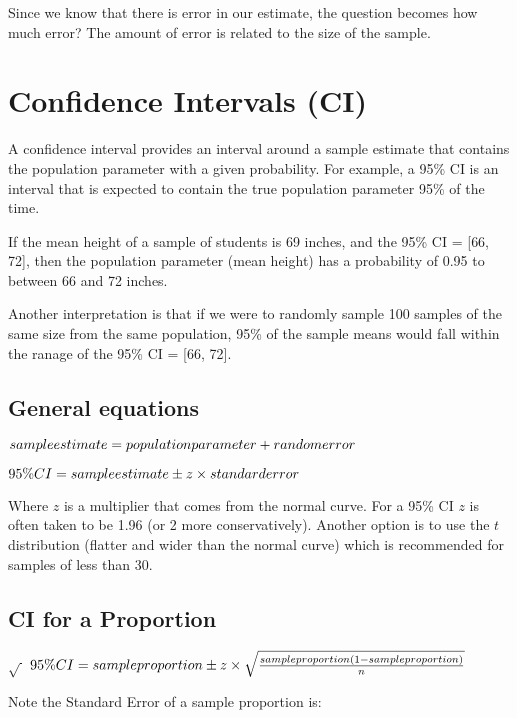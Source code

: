 \documentclass[
]{book}
\begin{document}
Since we know that there is error in our estimate, the question becomes how much error? The amount of error is related to the size of the sample.

\hypertarget{confidence-intervals-ci}{%
\section{Confidence Intervals (CI)}\label{confidence-intervals-ci}}

A confidence interval provides an interval around a sample estimate that contains the population parameter with a given probability. For example, a 95\% CI is an interval that is expected to contain the true population parameter 95\% of the time.

If the mean height of a sample of students is 69 inches, and the 95\% CI = {[}66, 72{]}, then the population parameter (mean height) has a probability of 0.95 to between 66 and 72 inches.

Another interpretation is that if we were to randomly sample 100 samples of the same size from the same population, 95\% of the sample means would fall within the ranage of the 95\% CI = {[}66, 72{]}.

\hypertarget{general-equations}{%
\subsection{General equations}\label{general-equations}}

\(sample \space estimate = population \space parameter + random \space error\)

\(95\%CI=sample \space estimate \pm z \times \space standard \space error\)

Where \(z\) is a multiplier that comes from the normal curve. For a 95\% CI \(z\) is often taken to be 1.96 (or 2 more conservatively). Another option is to use the \(t\) distribution (flatter and wider than the normal curve) which is recommended for samples of less than 30.

\hypertarget{ci-for-a-proportion}{%
\subsection{CI for a Proportion}\label{ci-for-a-proportion}}

\(\sqrt{\frac{}{}}\)
\(95\%CI=sample \space proportion \pm z \times \sqrt{\frac{sample \space proportion(1-sample \space proportion)}{n}}\)

Note the Standard Error of a sample proportion is:
\end{document}

